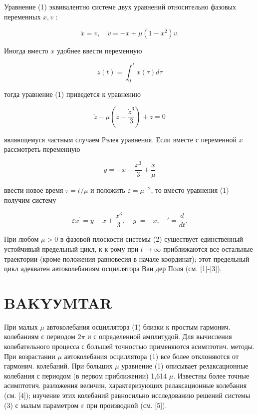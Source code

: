 \documentclass[10pt]{article}
\begin{document}
Уравнение (1) эквивалентно системе двух уравнений относительно фазовых переменных $x, v$ :



\[

\dot{x}=v, \quad \dot{v}=-x+\mu\left(1-x^{2}\right) v .

\]



Иногда вместо $x$ удобнее ввести переменную



\[

z(t)=\int_{0}^{t} x(\tau) d \tau

\]



тогда уравнение (1) приведется к уравнению



\[

\ddot{z}-\mu\left(\dot{z}-\frac{\dot{z}^{3}}{3}\right)+z=0

\]



являющемуся частным случаем Рэлея уравнения. Если вместе с переменной $x$ рассмотреть переменную



\[

y=-x+\frac{x^{3}}{3}+\frac{\dot{x}}{\mu}

\]



ввести новое время $\tau=t / \mu$ и положить $\varepsilon=\mu^{-2}$, то вместо уравнения (1) получим систему



\[

\varepsilon x^{\prime}=y-x+\frac{x^{3}}{3}, \quad y^{\prime}=-x, \quad '=\frac{d}{d t} .

\]



При любом $\mu>0$ в фазовой плоскости системы (2) сушествует единственный устойчивый предельный цикл, к к-рому при $t \rightarrow \infty$ приближаются все остальные траектории (кроме положения равновесия в начале координат); этот предельный цикл адекватен автоколебаниям осциллятора Ван дер Поля (см. [1]-[3]).



\section{BAKYУMTAR}

При малых $\mu$ автоколебания осциллятора (1) близки к простым гармонич. колебаниям с периодом $2 \pi$ и с определенной амплитудой. Для вычисления колебательного процесса с большей точностью применяются асимптотич. методы. При возрастании $\mu$ автоколебания осциллятора (1) все более отклоняются от гармонич. колебаний. При больших $\mu$ уравнение (1) описывает релаксационные колебания с периодом (в первом приближении) 1,614 $\mu$. Известны более точные асимптотич. разложения величин, характеризующих релаксационные колебания (см. [4]); изучение этих колебаний равносильно исследованию решений системы (3) с малым параметром $\varepsilon$ при производной (см. [5]).
\end{document}
